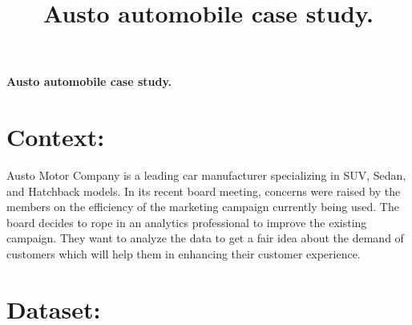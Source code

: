 \documentclass[12pt,a4paper]{style}
\title{\Large \bf
	Austo automobile case study. %
}
\begin{document}
\tableofcontents
\newpage
\Large {\bf{	Austo automobile case study.}}

	\section{Context:}
	Austo Motor Company is a leading car manufacturer specializing in SUV, Sedan, and Hatchback models. In its recent board meeting, concerns were raised by the members on the efficiency of the marketing campaign currently being used. The board decides to rope in an analytics professional to improve the existing campaign. They want to analyze the data to get a fair idea about the demand of customers which will help them in enhancing their customer experience.
	
	\section{Dataset:} 
\end{document}
